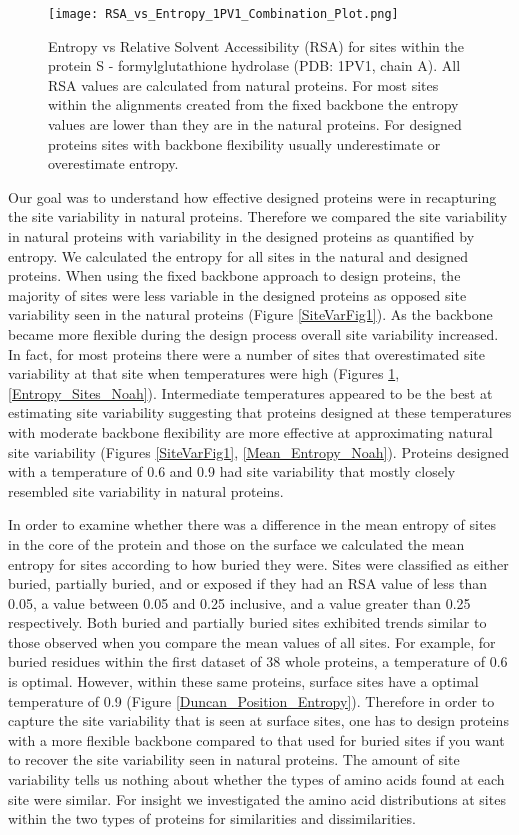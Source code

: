 \documentclass[12pt]{article}
\begin{document}
\begin{figure}[H]
\centering
\centerline{\texttt{[image: RSA\_vs\_Entropy\_1PV1\_Combination\_Plot.png]}}
\caption{Entropy vs Relative Solvent Accessibility (RSA) for sites within the protein S - formylglutathione hydrolase (PDB: 1PV1, chain A). All RSA values are calculated from natural proteins. For most sites within the alignments created from the fixed backbone the entropy values are lower than they are in the natural proteins.  For designed proteins sites with backbone flexibility usually underestimate or overestimate entropy.}
\label{SiteVarFig2}
\end{figure}

\par Our goal was to understand how effective designed proteins were in recapturing the site variability in natural proteins. Therefore we compared the site variability in natural proteins with variability in the designed proteins as quantified by entropy.  We calculated the entropy for all sites in the natural and designed proteins. When using the fixed backbone approach to design proteins, the majority of sites were less variable in the designed proteins as opposed site variability seen in the natural proteins (Figure \ref{SiteVarFig1}). As the backbone became more flexible during the design process overall site variability increased. In fact, for most proteins there were a number of sites that overestimated site variability at that site when temperatures were high (Figures \ref{SiteVarFig2}, \ref{Entropy_Sites_Noah}). Intermediate temperatures appeared to be the best at estimating site variability suggesting that proteins designed at these temperatures with moderate backbone flexibility are more effective at approximating natural site variability (Figures \ref{SiteVarFig1}, \ref{Mean_Entropy_Noah}). Proteins designed with a temperature of 0.6 and 0.9 had site variability that mostly closely resembled site variability in natural proteins.
 \par In order to examine whether there was a difference in the mean entropy of sites in the core of the protein and those on the surface we calculated the mean entropy for sites according to how buried they were. Sites were classified as either buried, partially buried, and or exposed if they had an RSA value of less than 0.05, a value between 0.05 and 0.25 inclusive, and a value greater than 0.25 respectively. Both buried and partially buried sites exhibited trends similar to those observed when you compare the mean values of all sites. For example, for buried residues within the first dataset of 38 whole proteins, a temperature of 0.6 is optimal. However, within these same proteins, surface sites have a optimal temperature of 0.9 (Figure \ref{Duncan_Position_Entropy}). Therefore in order to capture the site variability that is seen at surface sites, one has to design proteins with a more flexible backbone compared to that used for buried sites if you want to recover the site variability seen in natural proteins. The amount of site variability tells us nothing about whether the types of amino acids found at each site were similar. For insight we investigated the amino acid distributions at sites within the two types of proteins for similarities and dissimilarities. 
\end{document}
